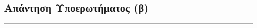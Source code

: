 \subsection{Απάντηση Υποερωτήματος (β)}
\label{ssec:Solution_4.2}
\doublespacing



\begin{center}
	\noindent\rule{\linewidth}{0.5pt}
\end{center}
\clearpage